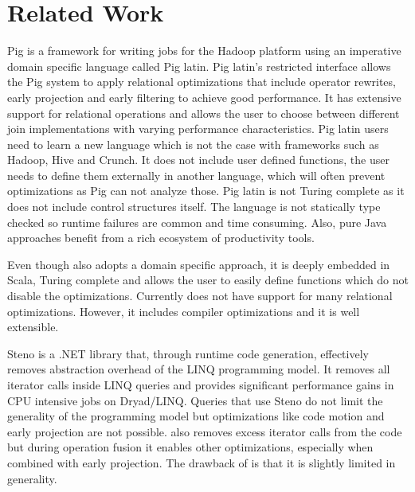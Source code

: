 \section{Related Work}
\label{sec:related-work}

Pig \cite{olston_pig_2008-1} is a framework for writing jobs for the Hadoop platform using an imperative domain specific language called Pig latin. Pig latin's restricted interface allows the Pig system to apply relational optimizations that include operator rewrites, early projection and early filtering to achieve good performance. 
It has extensive support for relational operations and allows the user to choose between different join implementations with varying performance characteristics. Pig latin users need to learn a new language which is not the case with frameworks such as Hadoop, Hive and Crunch. It does not include user defined functions, the user needs to define them externally in another language, which will often prevent optimizations as Pig can not analyze those. Pig latin is not Turing complete as it does not include control structures itself.
The language is not statically type checked so runtime failures are common and time consuming. Also, pure Java approaches benefit from a rich ecosystem of productivity tools. 

Even though \tool also adopts a domain specific approach, it is deeply embedded in Scala, Turing complete and allows the user to easily define functions which do not disable the optimizations. Currently \tool does not have support for many relational optimizations. However, it includes compiler optimizations and it is well extensible.

Steno \cite{murray_steno:_2011} is a .NET library that, through runtime code generation, effectively removes abstraction overhead of the LINQ programming model. It removes all iterator calls inside LINQ queries and provides significant performance gains in CPU intensive jobs on Dryad/LINQ. Queries that use Steno do not limit the generality of the programming model but optimizations like code motion and early projection are not possible. 
\tool also removes excess iterator calls from the code but during operation fusion it enables other optimizations, especially when combined with early projection. The drawback of \tool is that it is slightly limited in generality.


